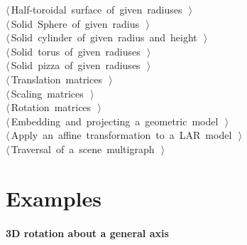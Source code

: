 \documentclass[11pt,oneside]{article}	%
\begin{document}
\begin{flushleft}
\begin{list}{}{}
\mbox{}\verb@@\hbox{$\langle\,$Half-toroidal surface of given radiuses\nobreak\ {\footnotesize {}}$\,\rangle$}\verb@@\\
\mbox{}\verb@@\hbox{$\langle\,$Solid Sphere of given radius\nobreak\ {\footnotesize {}}$\,\rangle$}\verb@@\\
\mbox{}\verb@@\hbox{$\langle\,$Solid cylinder of given radius and height\nobreak\ {\footnotesize {}}$\,\rangle$}\verb@@\\
\mbox{}\verb@@\hbox{$\langle\,$Solid torus of given radiuses\nobreak\ {\footnotesize {}}$\,\rangle$}\verb@@\\
\mbox{}\verb@@\hbox{$\langle\,$Solid pizza of given radiuses\nobreak\ {\footnotesize {}}$\,\rangle$}\verb@@\\
\mbox{}\verb@@\hbox{$\langle\,$Translation matrices\nobreak\ {\footnotesize {}}$\,\rangle$}\verb@@\\
\mbox{}\verb@@\hbox{$\langle\,$Scaling matrices\nobreak\ {\footnotesize {}}$\,\rangle$}\verb@@\\
\mbox{}\verb@@\hbox{$\langle\,$Rotation matrices\nobreak\ {\footnotesize {}}$\,\rangle$}\verb@@\\
\mbox{}\verb@@\hbox{$\langle\,$Embedding and projecting a geometric model\nobreak\ {\footnotesize {}}$\,\rangle$}\verb@@\\
\mbox{}\verb@@\hbox{$\langle\,$Apply an affine transformation to a LAR model\nobreak\ {\footnotesize {}}$\,\rangle$}\verb@@\\
\mbox{}\verb@@\hbox{$\langle\,$Traversal of a scene multigraph\nobreak\ {\footnotesize {}}$\,\rangle$}\verb@@\\
\mbox{}\verb@@{\NWsep}
\end{list}
\vspace{-2ex}
\end{flushleft}
\section{Examples}

\paragraph{3D rotation about a general axis}
\end{document}
